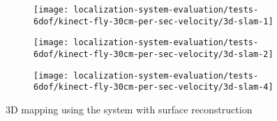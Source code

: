 \begin{figure}[H]
	\centering
	\begin{subfigure}[ht]{0.43\textwidth}
		\centering
		\texttt{[image: localization-system-evaluation/tests-6dof/kinect-fly-30cm-per-sec-velocity/3d-slam-1]}
	\end{subfigure}
	\begin{subfigure}[ht]{0.43\textwidth}
		\centering
		\texttt{[image: localization-system-evaluation/tests-6dof/kinect-fly-30cm-per-sec-velocity/3d-slam-2]}
	\end{subfigure}
	\begin{subfigure}[ht]{0.43\textwidth}
		\centering
		\texttt{[image: localization-system-evaluation/tests-6dof/kinect-fly-30cm-per-sec-velocity/3d-slam-4]}
	\end{subfigure}
	\caption{3D mapping using the  system with surface reconstruction}
	\label{fig:localization-system-evaluation_kinect-fly-30cm-per-sec-velocity-drl-slam}
\end{figure}
